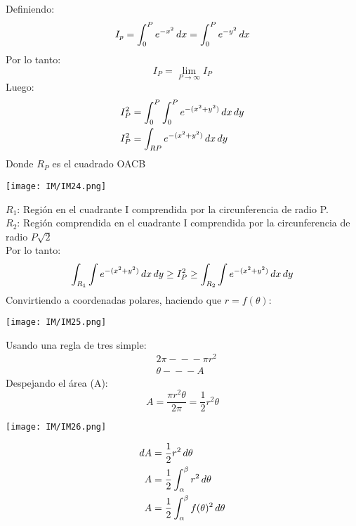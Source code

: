 \documentclass[
	12pt, %
	fleqn, %
	a4paper, %
]{LegrandOrangeBook}
\begin{document}
\begin{theorem}[Demostrar $\int_0^{\infty}e^{-u^2}\diff u=\frac{\sqrt{\pi}}{2}$]
Definiendo:
\begin{displaymath}
I_p=\int_0^Pe^{-x^2}\mathop{}\!d x=\int_0^Pe^{-y^2}\mathop{}\!d x
\end{displaymath}
Por lo tanto:
\begin{displaymath}
I_P=\lim_{P\to\infty}I_P
\end{displaymath}
Luego:
\begin{align*}
I_P^2&=\int_0^P\int_0^Pe^{-(x^2+y^2)}\mathop{}\!d x\mathop{}\!d y\\
I_P^2&=\int_{RP}e^{-(x^2+y^2)}\mathop{}\!d x\mathop{}\!d y
\end{align*}
Donde $R_P$ es el cuadrado OACB
\begin{center}
\texttt{[image: IM/IM24.png]}
\end{center}
$R_1$: Región en el cuadrante I comprendida por la circunferencia de radio P.\\
$R_2$: Región comprendida en el cuadrante I comprendida por la circunferencia de radio $P\sqrt{2}$\\
Por lo tanto:
\begin{displaymath}
\int_{R_1}\int e^{-(x^2+y^2)}\mathop{}\!d x\mathop{}\!d y\geq I_P^2 \geq \int_{R_2}\int e^{-(x^2+y^2)}\mathop{}\!d x\mathop{}\!d y
\end{displaymath}
Convirtiendo a coordenadas polares, haciendo que $r=f(\theta)$:
\begin{center}
\texttt{[image: IM/IM25.png]}
\end{center}
Usando una regla de tres simple:
\begin{align*}
& 2\pi -\!\!\!-\!\!\!- \pi r^2\\
& \theta -\!\!\!-\!\!\!- A
\end{align*}
Despejando el área (A):
\begin{displaymath}
A=\frac{\pi r^2\theta}{2\pi}=\frac{1}{2}r^2\theta
\end{displaymath}
\begin{center}
\texttt{[image: IM/IM26.png]}
\end{center}
\begin{align*}
\mathop{}\!d A&=\frac{1}{2}r^2\mathop{}\!d\theta\\
A&=\frac{1}{2}\int_{\alpha}^{\beta}r^2\mathop{}\!d\theta\\
A&=\frac{1}{2}\int_{\alpha}^{\beta}f(\theta)^2\mathop{}\!d\theta
\end{align*}
\begin{center}

\end{center}
\end{theorem}
\end{document}
